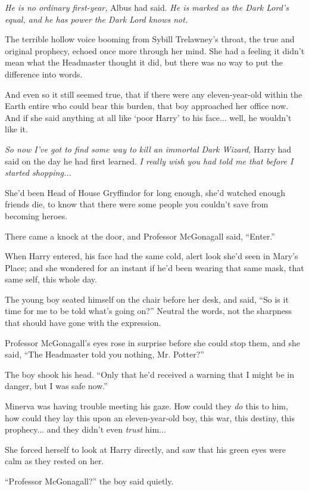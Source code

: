 \emph{He is no ordinary first-year,} Albus had said. \emph{He is marked as the Dark Lord's equal, and he has power the Dark Lord knows not.}

The terrible hollow voice booming from Sybill Trelawney's throat, the true and original prophecy, echoed once more through her mind. She had a feeling it didn't mean what the Headmaster thought it did, but there was no way to put the difference into words.

And even so it still seemed true, that if there were any eleven-year-old within the Earth entire who could bear this burden, that boy approached her office now. And if she said anything at all like `poor Harry' to his face... well, he wouldn't like it.

\emph{So now I've got to find some way to kill an immortal Dark Wizard,} Harry had said on the day he had first learned. \emph{I really wish you had told me that before I started shopping...}

She'd been Head of House Gryffindor for long enough, she'd watched enough friends die, to know that there were some people you couldn't save from becoming heroes.

There came a knock at the door, and Professor McGonagall said, ``Enter.''

When Harry entered, his face had the same cold, alert look she'd seen in Mary's Place; and she wondered for an instant if he'd been wearing that same mask, that same self, this whole day.

The young boy seated himself on the chair before her desk, and said, ``So is it time for me to be told what's going on?'' Neutral the words, not the sharpness that should have gone with the expression.

Professor McGonagall's eyes rose in surprise before she could stop them, and she said, ``The Headmaster told you nothing, Mr. Potter?''

The boy shook his head. ``Only that he'd received a warning that I might be in danger, but I was safe now.''

Minerva was having trouble meeting his gaze. How could they \emph{do} this to him, how could they lay this upon an eleven-year-old boy, this war, this destiny, this prophecy... and they didn't even \emph{trust} him...

She forced herself to look at Harry directly, and saw that his green eyes were calm as they rested on her.

``Professor McGonagall?'' the boy said quietly.

